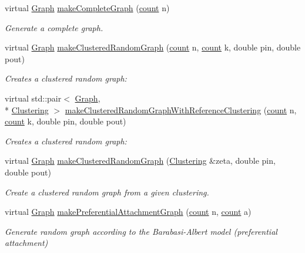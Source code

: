 \begin{DoxyCompactItemize}
virtual \hyperlink{class_ensemble_clustering_1_1_graph}{Graph} \hyperlink{class_ensemble_clustering_1_1_graph_generator_af418835f00a4fc70a76eebe7c70104d2}{make\-Complete\-Graph} (\hyperlink{namespace_ensemble_clustering_a2482e94ca22a0c6544a5a9173186fde8}{count} n)
\begin{DoxyCompactList}\small\item\em Generate a complete graph. \end{DoxyCompactList}\item 
virtual \hyperlink{class_ensemble_clustering_1_1_graph}{Graph} \hyperlink{class_ensemble_clustering_1_1_graph_generator_aefc6fbc6e23235419d1a2030d688b4bd}{make\-Clustered\-Random\-Graph} (\hyperlink{namespace_ensemble_clustering_a2482e94ca22a0c6544a5a9173186fde8}{count} n, \hyperlink{namespace_ensemble_clustering_a2482e94ca22a0c6544a5a9173186fde8}{count} k, double pin, double pout)
\begin{DoxyCompactList}\small\item\em Creates a clustered random graph\-: \end{DoxyCompactList}\item 
virtual std\-::pair$<$ \hyperlink{class_ensemble_clustering_1_1_graph}{Graph}, \\*
\hyperlink{class_ensemble_clustering_1_1_clustering}{Clustering} $>$ \hyperlink{class_ensemble_clustering_1_1_graph_generator_a573c023203806f719bdd0caf17764340}{make\-Clustered\-Random\-Graph\-With\-Reference\-Clustering} (\hyperlink{namespace_ensemble_clustering_a2482e94ca22a0c6544a5a9173186fde8}{count} n, \hyperlink{namespace_ensemble_clustering_a2482e94ca22a0c6544a5a9173186fde8}{count} k, double pin, double pout)
\begin{DoxyCompactList}\small\item\em Creates a clustered random graph\-: \end{DoxyCompactList}\item 
virtual \hyperlink{class_ensemble_clustering_1_1_graph}{Graph} \hyperlink{class_ensemble_clustering_1_1_graph_generator_a098d0364dc2792e97f7242f5df1534d0}{make\-Clustered\-Random\-Graph} (\hyperlink{class_ensemble_clustering_1_1_clustering}{Clustering} \&zeta, double pin, double pout)
\begin{DoxyCompactList}\small\item\em Create a clustered random graph from a given clustering. \end{DoxyCompactList}\item 
virtual \hyperlink{class_ensemble_clustering_1_1_graph}{Graph} \hyperlink{class_ensemble_clustering_1_1_graph_generator_aca4bcf582579a571c5a6b4a1cd59770e}{make\-Preferential\-Attachment\-Graph} (\hyperlink{namespace_ensemble_clustering_a2482e94ca22a0c6544a5a9173186fde8}{count} n, \hyperlink{namespace_ensemble_clustering_a2482e94ca22a0c6544a5a9173186fde8}{count} a)
\begin{DoxyCompactList}\small\item\em Generate random graph according to the Barabasi-\/\-Albert model (preferential attachment) \end{DoxyCompactList}\end{DoxyCompactItemize}


